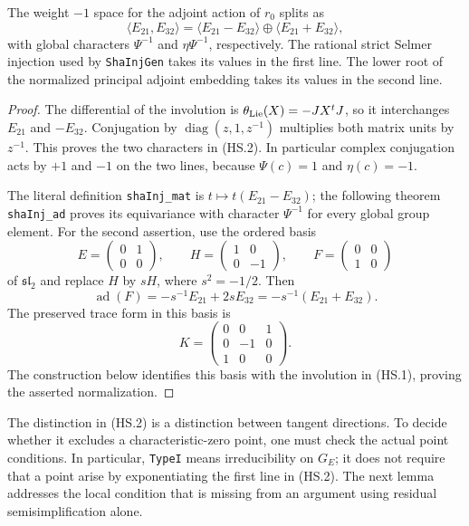 \begin{lemma}
The weight $-1$ space for the adjoint action of $r_0$ splits as
\[
 \langle E_{21},E_{32}\rangle
  =\langle E_{21}-E_{32}\rangle
       \oplus\langle E_{21}+E_{32}\rangle,
                                                               \tag{HS.2}
\]
with global characters $\Psi^{-1}$ and $\eta\Psi^{-1}$,
respectively.  The rational strict Selmer injection used by
\texttt{ShaInjGen} takes its values in the first line.  The lower
root of the normalized principal adjoint embedding takes its values
in the second line.
\end{lemma}
\begin{proof}
The differential of the involution is
$\theta_{\rm Lie}(X)=-JX^tJ$, so it interchanges
$E_{21}$ and $-E_{32}$.  Conjugation by
$\operatorname{diag}(z,1,z^{-1})$ multiplies both matrix units
by $z^{-1}$.  This proves the two characters in (HS.2).
In particular complex conjugation acts by $+1$ and $-1$ on
the two lines, because $\Psi(c)=1$ and $\eta(c)=-1$.

The literal definition \texttt{shaInj\_mat} is
$t\mapsto t(E_{21}-E_{32})$; the following theorem
\texttt{shaInj\_ad} proves its equivariance with character
$\Psi^{-1}$ for every global group element.
For the second assertion, use the ordered basis
\[
 E=\begin{pmatrix}0&1\\0&0\end{pmatrix},\qquad
 H=\begin{pmatrix}1&0\\0&-1\end{pmatrix},\qquad
 F=\begin{pmatrix}0&0\\1&0\end{pmatrix}
\]
of $\mathfrak{sl}_2$ and replace $H$ by $sH$, where
$s^2=-1/2$.  Then
\[
 \operatorname{ad}(F)=-s^{-1}E_{21}+2sE_{32}
                  =-s^{-1}(E_{21}+E_{32}).                    \tag{HS.3}
\]
The preserved trace form in this basis is
\[
 K=\begin{pmatrix}0&0&1\\0&-1&0\\1&0&0\end{pmatrix}.
                                                               \tag{HS.4}
\]
The construction below identifies this basis with the involution
in (HS.1), proving the asserted normalization.
\end{proof}

The distinction in (HS.2) is a distinction between tangent
directions.  To decide whether it excludes a characteristic-zero
point, one must check the actual point conditions.  In particular,
\texttt{TypeI} means irreducibility on $G_E$; it does not require
that a point arise by exponentiating the first line in (HS.2).
The next lemma addresses the local condition that is missing from
an argument using residual semisimplification alone.

